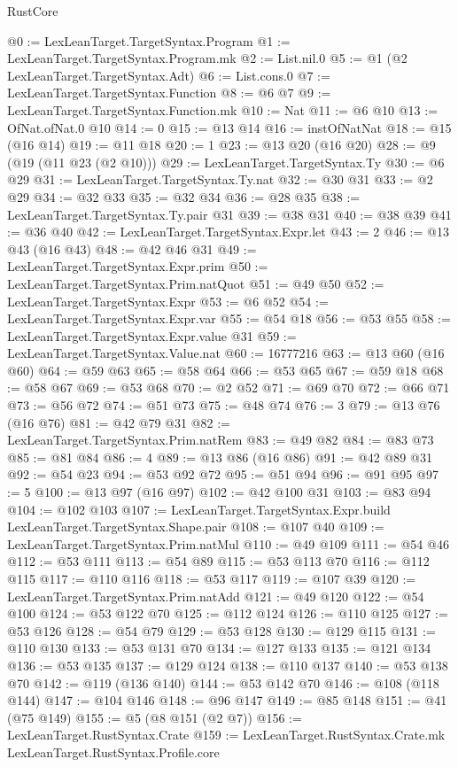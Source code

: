 \begin{lexlean}{RustCore}
\begin{coremodule}
@0 := LexLeanTarget.TargetSyntax.Program
@1 := LexLeanTarget.TargetSyntax.Program.mk
@2 := List.nil.{0}
@5 := @1 (@2 LexLeanTarget.TargetSyntax.Adt)
@6 := List.cons.{0}
@7 := LexLeanTarget.TargetSyntax.Function
@8 := @6 @7
@9 := LexLeanTarget.TargetSyntax.Function.mk
@10 := Nat
@11 := @6 @10
@13 := OfNat.ofNat.{0} @10
@14 := 0
@15 := @13 @14
@16 := instOfNatNat
@18 := @15 (@16 @14)
@19 := @11 @18
@20 := 1
@23 := @13 @20 (@16 @20)
@28 := @9 (@19 (@11 @23 (@2 @10)))
@29 := LexLeanTarget.TargetSyntax.Ty
@30 := @6 @29
@31 := LexLeanTarget.TargetSyntax.Ty.nat
@32 := @30 @31
@33 := @2 @29
@34 := @32 @33
@35 := @32 @34
@36 := @28 @35
@38 := LexLeanTarget.TargetSyntax.Ty.pair @31
@39 := @38 @31
@40 := @38 @39
@41 := @36 @40
@42 := LexLeanTarget.TargetSyntax.Expr.let
@43 := 2
@46 := @13 @43 (@16 @43)
@48 := @42 @46 @31
@49 := LexLeanTarget.TargetSyntax.Expr.prim
@50 := LexLeanTarget.TargetSyntax.Prim.natQuot
@51 := @49 @50
@52 := LexLeanTarget.TargetSyntax.Expr
@53 := @6 @52
@54 := LexLeanTarget.TargetSyntax.Expr.var
@55 := @54 @18
@56 := @53 @55
@58 := LexLeanTarget.TargetSyntax.Expr.value @31
@59 := LexLeanTarget.TargetSyntax.Value.nat
@60 := 16777216
@63 := @13 @60 (@16 @60)
@64 := @59 @63
@65 := @58 @64
@66 := @53 @65
@67 := @59 @18
@68 := @58 @67
@69 := @53 @68
@70 := @2 @52
@71 := @69 @70
@72 := @66 @71
@73 := @56 @72
@74 := @51 @73
@75 := @48 @74
@76 := 3
@79 := @13 @76 (@16 @76)
@81 := @42 @79 @31
@82 := LexLeanTarget.TargetSyntax.Prim.natRem
@83 := @49 @82
@84 := @83 @73
@85 := @81 @84
@86 := 4
@89 := @13 @86 (@16 @86)
@91 := @42 @89 @31
@92 := @54 @23
@94 := @53 @92 @72
@95 := @51 @94
@96 := @91 @95
@97 := 5
@100 := @13 @97 (@16 @97)
@102 := @42 @100 @31
@103 := @83 @94
@104 := @102 @103
@107 := LexLeanTarget.TargetSyntax.Expr.build LexLeanTarget.TargetSyntax.Shape.pair
@108 := @107 @40
@109 := LexLeanTarget.TargetSyntax.Prim.natMul
@110 := @49 @109
@111 := @54 @46
@112 := @53 @111
@113 := @54 @89
@115 := @53 @113 @70
@116 := @112 @115
@117 := @110 @116
@118 := @53 @117
@119 := @107 @39
@120 := LexLeanTarget.TargetSyntax.Prim.natAdd
@121 := @49 @120
@122 := @54 @100
@124 := @53 @122 @70
@125 := @112 @124
@126 := @110 @125
@127 := @53 @126
@128 := @54 @79
@129 := @53 @128
@130 := @129 @115
@131 := @110 @130
@133 := @53 @131 @70
@134 := @127 @133
@135 := @121 @134
@136 := @53 @135
@137 := @129 @124
@138 := @110 @137
@140 := @53 @138 @70
@142 := @119 (@136 @140)
@144 := @53 @142 @70
@146 := @108 (@118 @144)
@147 := @104 @146
@148 := @96 @147
@149 := @85 @148
@151 := @41 (@75 @149)
@155 := @5 (@8 @151 (@2 @7))
@156 := LexLeanTarget.RustSyntax.Crate
@159 := LexLeanTarget.RustSyntax.Crate.mk LexLeanTarget.RustSyntax.Profile.core

\end{coremodule}
\end{lexlean}
